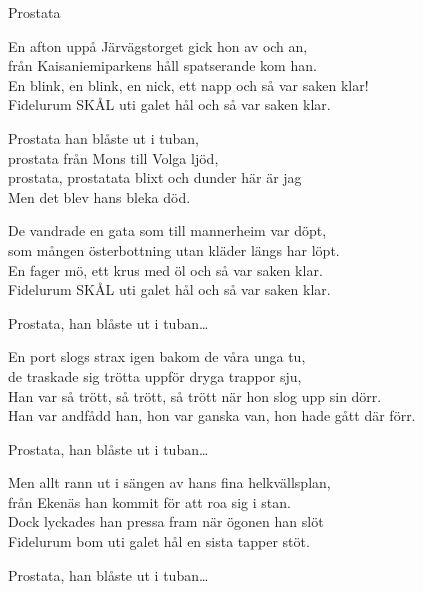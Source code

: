 \begin{song}{Prostata}


    
    \showversenumber	
	En afton uppå Järvägstorget gick hon av och an,\\
	från Kaisaniemiparkens håll spatserande kom han.\\
	En blink, en blink, en nick, ett napp och så var saken klar!\\
	Fidelurum SKÅL uti galet hål och så var saken klar.
	
	\vspace{-.1cm}
	Prostata han blåste ut i tuban,\\
	prostata från Mons till Volga ljöd,\\
	prostata, prostatata blixt och dunder här är jag\\
	Men det blev hans bleka död.
	
	\showversenumber
	De vandrade en gata som till mannerheim var döpt,\\
	som mången österbottning utan kläder längs har löpt.\\
	En fager mö, ett krus med öl och så var saken klar.\\
	Fidelurum SKÅL uti galet hål och så var saken klar.

	\vspace{-.1cm}
	Prostata, han blåste ut i tuban\ldots

	\showversenumber
	En port slogs strax igen bakom de våra unga tu,\\
	de traskade sig trötta uppför dryga trappor sju,\\
	Han var så trött, så trött, så trött när hon slog upp sin dörr.\\
	Han var andfådd han, hon var ganska van, hon hade gått där förr.

	\vspace{-.1cm}
	Prostata, han blåste ut i tuban\ldots
	
	\showversenumber
	Men allt rann ut i sängen av hans fina helkvällsplan,\\
	från Ekenäs han kommit för att roa sig i stan.\\
	Dock lyckades han pressa fram när ögonen han slöt\\
	Fidelurum bom uti galet hål en sista tapper stöt.

	\vspace{-.1cm}
	Prostata, han blåste ut i tuban\ldots
	
\end{song}
